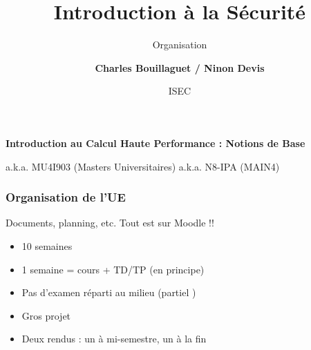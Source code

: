\documentclass[10pt]{beamer}
\title[Introduction à la Sécurité]{Introduction à la Sécurité}
\subtitle{Organisation}
\author[C. Bouillaguet]{\textbf{Charles Bouillaguet / Ninon Devis}}
\institute[SU]{Sorbonne Université}
\date{ISEC}
\begin{document}

\begin{frame}
  
  \centering

  
  \vspace{1cm}
  
  \textbf{\Large Introduction au Calcul Haute Performance : Notions de Base}

  \bigskip

  a.k.a. MU4I903 (Masters Universitaires) a.k.a. N8-IPA (MAIN4)
\end{frame}


\begin{frame}
  \frametitle{Organisation de l'UE}

  \begin{block}{Documents, planning, etc.}
    Tout est sur Moodle !!
  \end{block}
  
  \begin{itemize}
  \item 10 semaines
  \item 1 semaine = cours + TD/TP (en principe)
  \item Pas d'examen réparti au milieu (\og partiel \fg)
  \item Gros projet
  \item Deux rendus : un à mi-semestre, un à la fin
  \end{itemize}
\end{frame}

\end{document}
